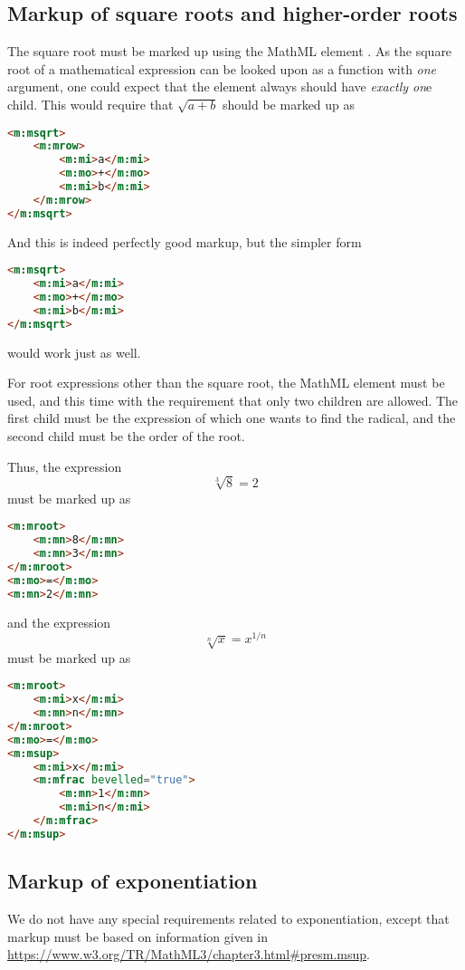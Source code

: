 \documentclass[english,a4paper,11pt]{article}
\begin{document}
\subsection{Markup of square roots and higher-order roots}
The square root must be marked up using the MathML element . As the square root of a mathematical expression can be looked upon as a function with \emph{one} argument, one could expect that the  element always should have \emph{exactly on}e child.
This would require that $\sqrt{a + b}$ should be marked up as
\begin{lstlisting}[language=HTML]
<m:msqrt>
	<m:mrow>
		<m:mi>a</m:mi>
		<m:mo>+</m:mo>
		<m:mi>b</m:mi>
	</m:mrow>
</m:msqrt>
\end{lstlisting}
And this is indeed perfectly good markup, but the simpler form
\begin{lstlisting}[language=HTML]
<m:msqrt>
	<m:mi>a</m:mi>
	<m:mo>+</m:mo>
	<m:mi>b</m:mi>
</m:msqrt>
\end{lstlisting}
would work just as well.

\bigskip For root expressions other than the square root, the MathML element  must be used, and this time with the requirement that only two children are allowed. The first child must be the expression of which one wants to find the radical, and the second child must be the order of the root.

Thus, the expression \begin{equation}\sqrt[3]{8} =2\end{equation}
must be marked up as
\begin{lstlisting}[language=HTML]
<m:mroot>
	<m:mn>8</m:mn>
	<m:mn>3</m:mn>
</m:mroot>
<m:mo>=</m:mo>
<m:mn>2</m:mn>
\end{lstlisting}
and the expression \begin{equation}\sqrt[n]{x}=x^{1/n} \end{equation}
must be marked up as
\begin{lstlisting}[language=HTML]
<m:mroot>
	<m:mi>x</m:mi>
	<m:mn>n</m:mn>
</m:mroot>
<m:mo>=</m:mo>
<m:msup>
	<m:mi>x</m:mi>
	<m:mfrac bevelled="true">
		<m:mn>1</m:mn>
		<m:mi>n</m:mi>
	</m:mfrac>
</m:msup>
\end{lstlisting}

\subsection{Markup of exponentiation}
We do not have any special requirements related to exponentiation, except that markup must be based on information given in \url{https://www.w3.org/TR/MathML3/chapter3.html#presm.msup}.
\end{document}
